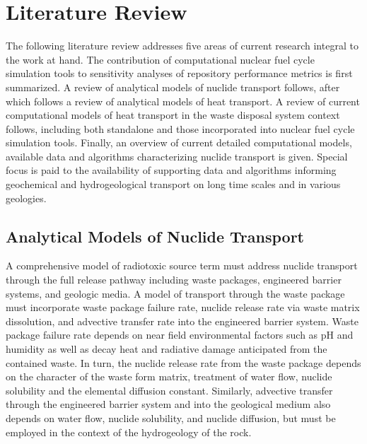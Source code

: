 \chapter{Literature Review}\label{ch:litrev}

The following literature review addresses five areas of current 
research integral to the work at hand. The contribution of 
computational nuclear fuel cycle simulation tools to sensitivity 
analyses of repository performance metrics is first summarized. A 
review of analytical models of nuclide transport follows, after which 
follows a review of analytical models of heat transport. A review of 
current computational models of heat transport in the waste disposal 
system context follows, including both 
standalone and those incorporated into nuclear fuel cycle simulation 
tools. Finally, an overview of current detailed computational models, 
available data and algorithms characterizing nuclide transport is 
given.  Special focus is paid to the availability of supporting data 
and algorithms informing geochemical and hydrogeological transport on 
long time scales and in various geologies. 




\section{Analytical Models of Nuclide Transport} 
\label{sec:analytical_nuc}

A comprehensive model of radiotoxic source term must address nuclide 
transport through the full release pathway including waste packages, 
engineered barrier systems, and geologic media. A model of transport 
through the waste package must incorporate waste package failure rate, 
nuclide release rate via waste matrix dissolution, and advective 
transfer rate into the engineered barrier system.  Waste package 
failure rate depends on near field environmental factors such as pH 
and humidity as well as decay heat and radiative damage anticipated 
from the contained waste.  In turn, the nuclide release rate from the 
waste package depends on the character of the waste form matrix, 
treatment of water flow, nuclide solubility and the elemental 
diffusion constant.  Similarly, advective transfer through the 
engineered barrier system and into the geological medium also depends 
on water flow, nuclide solubility, and nuclide diffusion, but must be 
employed in the context of the hydrogeology of the rock.   

